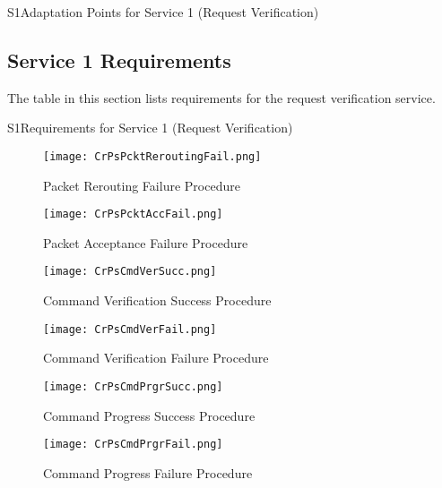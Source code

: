 \documentclass{pnp_article}
\begin{document}
\begin{crAp}{S1}{Adaptation Points for Service 1 (Request Verification)}
\end{crAp}


\subsection{Service 1 Requirements}
The table in this section lists requirements for the request verification service.

\begin{crReq}{S1}{Requirements for Service 1 (Request Verification)}
\end{crReq}


\newpage
\begin{figure}[H]
 \centering
 \texttt{[image: CrPsPcktReroutingFail.png]}
 \caption{Packet Rerouting Failure Procedure}
 \label{fig:PcktReroutingFail}
\end{figure}

\begin{figure}[htbp]
 \centering
 \texttt{[image: CrPsPcktAccFail.png]}
 \caption{Packet Acceptance Failure Procedure}
 \label{fig:PcktAccFail}
\end{figure}

\begin{figure}[htbp]
 \centering
 \texttt{[image: CrPsCmdVerSucc.png]}
 \caption{Command Verification Success Procedure}
 \label{fig:CmdVerSucc}
\end{figure}

\begin{figure}[htbp]
 \centering
 \texttt{[image: CrPsCmdVerFail.png]}
 \caption{Command Verification Failure Procedure}
 \label{fig:CmdVerFail}
\end{figure}

\begin{figure}[htbp]
 \centering
 \texttt{[image: CrPsCmdPrgrSucc.png]}
 \caption{Command Progress Success Procedure}
 \label{fig:CmdPrgrSucc}
\end{figure}

\begin{figure}[H]
 \centering
 \texttt{[image: CrPsCmdPrgrFail.png]}
 \caption{Command Progress Failure Procedure}
 \label{fig:CmdPrgrFail}
\end{figure}
\end{document}
